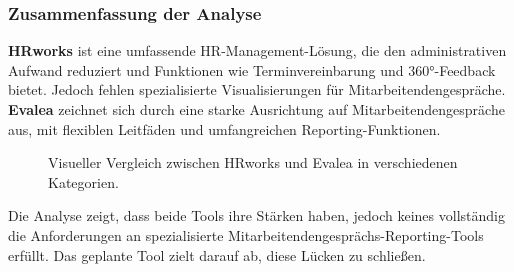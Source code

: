 \subsubsection{Zusammenfassung der Analyse}
\textbf{HRworks} ist eine umfassende HR-Management-Lösung, die den administrativen Aufwand reduziert und Funktionen wie Terminvereinbarung und 360°-Feedback bietet. Jedoch fehlen spezialisierte Visualisierungen für Mitarbeitendengespräche. \textbf{Evalea} zeichnet sich durch eine starke Ausrichtung auf Mitarbeitendengespräche aus, mit flexiblen Leitfäden und umfangreichen Reporting-Funktionen.

\begin{figure}[h!]
    \centering
    \caption{Visueller Vergleich zwischen HRworks und Evalea in verschiedenen Kategorien.}
    \label{fig:hrworks_evalea_comparison}
\end{figure}

Die Analyse zeigt, dass beide Tools ihre Stärken haben, jedoch keines vollständig die Anforderungen an spezialisierte Mitarbeitendengesprächs-Reporting-Tools erfüllt. Das geplante Tool zielt darauf ab, diese Lücken zu schließen.
